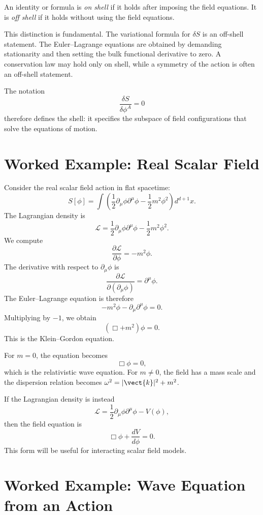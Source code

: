 \begin{definitionbox}
An identity or formula is \emph{on shell} if it holds after imposing the field
equations. It is \emph{off shell} if it holds without using the field equations.
\end{definitionbox}

This distinction is fundamental. The variational formula for \(\delta S\) is an
off-shell statement. The Euler--Lagrange equations are obtained by demanding
stationarity and then setting the bulk functional derivative to zero. A
conservation law may hold only on shell, while a symmetry of the action is often
an off-shell statement.

The notation
\[
    \frac{\delta S}{\delta\phi^A}=0
\]
therefore defines the shell: it specifies the subspace of field configurations
that solve the equations of motion.

\section{Worked Example: Real Scalar Field}

Consider the real scalar field action in flat spacetime:
\[
    S[\phi]=\int \left(
        \frac{1}{2}\partial_\mu\phi\partial^\mu\phi
        -\frac{1}{2}m^2\phi^2
    \right)d^{d+1}x.
\]
The Lagrangian density is
\[
    \mathcal{L}
    =\frac{1}{2}\partial_\mu\phi\partial^\mu\phi
    -\frac{1}{2}m^2\phi^2.
\]
We compute
\[
    \frac{\partial\mathcal{L}}{\partial\phi}=-m^2\phi.
\]
The derivative with respect to \(\partial_\mu\phi\) is
\[
    \frac{\partial\mathcal{L}}{\partial(\partial_\mu\phi)}=\partial^\mu\phi.
\]
The Euler--Lagrange equation is therefore
\[
    -m^2\phi-\partial_\mu\partial^\mu\phi=0.
\]
Multiplying by \(-1\), we obtain
\[
    (\Box+m^2)\phi=0.
\]
This is the Klein--Gordon equation.

\begin{examplebox}
For \(m=0\), the equation becomes
\[
    \Box\phi=0,
\]
which is the relativistic wave equation. For \(m\neq 0\), the field has a mass
scale and the dispersion relation becomes \(\omega^2=|\vect{k}|^2+m^2\).
\end{examplebox}

If the Lagrangian density is instead
\[
    \mathcal{L}=\frac{1}{2}\partial_\mu\phi\partial^\mu\phi - V(\phi),
\]
then the field equation is
\[
    \Box\phi+\frac{dV}{d\phi}=0.
\]
This form will be useful for interacting scalar field models.

\section{Worked Example: Wave Equation from an Action}

